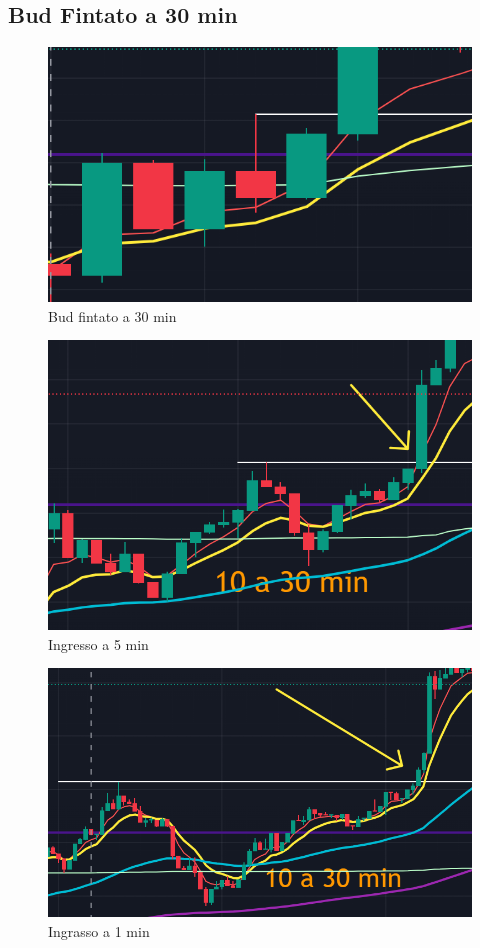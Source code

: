 \subsection*{Bud Fintato a 30 min}
\begin{figure}[hbtp]
\centering
\includegraphics[scale=0.5]{../Immagini/budfintato-30min.PNG}
\caption{Bud fintato a 30 min}
\end{figure}
\begin{figure}[hbtp]
\centering
\includegraphics[scale=0.5]{../Immagini/ingresso-5min.PNG}
\caption{Ingresso a 5 min}
\end{figure}
\begin{figure}[hbtp]
\centering
\includegraphics[scale=0.5]{../Immagini/ingresso-1min.PNG}
\caption{Ingrasso a 1 min }
\end{figure}





